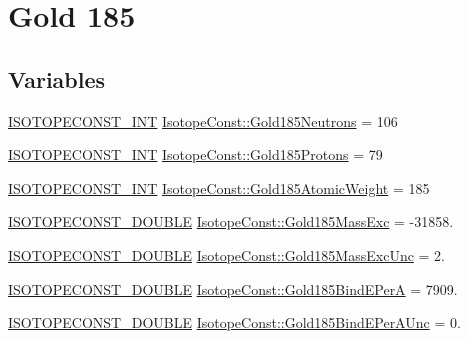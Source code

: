 \hypertarget{group___isotope_const-_gold-_au185}{}\section{Gold 185}
\label{group___isotope_const-_gold-_au185}
\subsection*{Variables}
\begin{DoxyCompactItemize}
\item 
\mbox{\hyperlink{group___isotope_const-_macros_ga5f18360b3e99483a35c32d789e62621c}{I\+S\+O\+T\+O\+P\+E\+C\+O\+N\+S\+T\+\_\+\+I\+NT}} \mbox{\hyperlink{group___isotope_const-_gold-_au185_gafed4d635fe0424cded3737f93e4abbd3}{Isotope\+Const\+::\+Gold185\+Neutrons}} = 106
\item 
\mbox{\hyperlink{group___isotope_const-_macros_ga5f18360b3e99483a35c32d789e62621c}{I\+S\+O\+T\+O\+P\+E\+C\+O\+N\+S\+T\+\_\+\+I\+NT}} \mbox{\hyperlink{group___isotope_const-_gold-_au185_gabf5f934afd4f33dce3c5186b532b8538}{Isotope\+Const\+::\+Gold185\+Protons}} = 79
\item 
\mbox{\hyperlink{group___isotope_const-_macros_ga5f18360b3e99483a35c32d789e62621c}{I\+S\+O\+T\+O\+P\+E\+C\+O\+N\+S\+T\+\_\+\+I\+NT}} \mbox{\hyperlink{group___isotope_const-_gold-_au185_ga909549896b571630fe66d06e7e7a4604}{Isotope\+Const\+::\+Gold185\+Atomic\+Weight}} = 185
\item 
\mbox{\hyperlink{group___isotope_const-_macros_ga8f45a7272ce02c0b4c65c44636ed719a}{I\+S\+O\+T\+O\+P\+E\+C\+O\+N\+S\+T\+\_\+\+D\+O\+U\+B\+LE}} \mbox{\hyperlink{group___isotope_const-_gold-_au185_ga2ef84b05354097e239cf2bcbc9927319}{Isotope\+Const\+::\+Gold185\+Mass\+Exc}} = -\/31858.
\item 
\mbox{\hyperlink{group___isotope_const-_macros_ga8f45a7272ce02c0b4c65c44636ed719a}{I\+S\+O\+T\+O\+P\+E\+C\+O\+N\+S\+T\+\_\+\+D\+O\+U\+B\+LE}} \mbox{\hyperlink{group___isotope_const-_gold-_au185_gaf4792a1a405eb7a4fd9593276b44630d}{Isotope\+Const\+::\+Gold185\+Mass\+Exc\+Unc}} = 2.
\item 
\mbox{\hyperlink{group___isotope_const-_macros_ga8f45a7272ce02c0b4c65c44636ed719a}{I\+S\+O\+T\+O\+P\+E\+C\+O\+N\+S\+T\+\_\+\+D\+O\+U\+B\+LE}} \mbox{\hyperlink{group___isotope_const-_gold-_au185_ga2fbcfff0391af9e968fc81ca17398287}{Isotope\+Const\+::\+Gold185\+Bind\+E\+PerA}} = 7909.
\item 
\mbox{\hyperlink{group___isotope_const-_macros_ga8f45a7272ce02c0b4c65c44636ed719a}{I\+S\+O\+T\+O\+P\+E\+C\+O\+N\+S\+T\+\_\+\+D\+O\+U\+B\+LE}} \mbox{\hyperlink{group___isotope_const-_gold-_au185_ga2068c712ee5b8f4eb039fadde050c3ab}{Isotope\+Const\+::\+Gold185\+Bind\+E\+Per\+A\+Unc}} = 0.

\end{DoxyCompactItemize}
